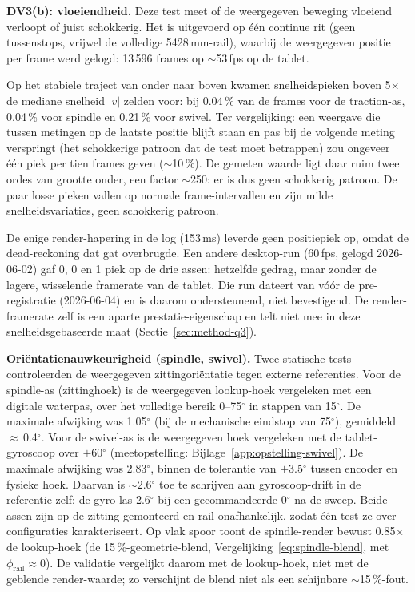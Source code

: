 \documentclass[10pt, a4paper, twocolumn]{article}
\begin{document}
\textbf{DV3(b): vloeiendheid.} Deze test meet of de weergegeven beweging vloeiend
verloopt of juist schokkerig. Het is uitgevoerd op één continue rit (geen
tussenstops, vrijwel de volledige 5428\,mm-rail), waarbij de weergegeven positie
per frame werd gelogd: 13\,596 frames op $\sim$53\,fps op de tablet.

Op het stabiele traject van onder naar boven kwamen snelheidspieken boven
5$\times$ de mediane snelheid $|v|$ zelden voor: bij 0.04\,\% van de frames voor
de traction-as, 0.04\,\% voor spindle en 0.21\,\% voor swivel. Ter vergelijking:
een weergave die tussen metingen op de laatste positie blijft staan en pas bij de
volgende meting verspringt (het schokkerige patroon dat de test
moet betrappen) zou ongeveer één piek per tien frames geven ($\sim$10\,\%). De
gemeten waarde ligt daar ruim twee ordes van grootte onder, een factor $\sim$250:
er is dus geen schokkerig patroon. De paar losse pieken vallen op normale
frame-intervallen en zijn milde snelheidsvariaties, geen schokkerig patroon.

De enige render-hapering in de log (153\,ms) leverde geen positiepiek op, omdat de
dead-reckoning dat gat overbrugde. Een andere desktop-run (60\,fps, gelogd
2026-06-02) gaf 0, 0 en 1 piek op de drie assen: hetzelfde gedrag, maar zonder de
lagere, wisselende framerate van de tablet. Die run dateert van vóór de
pre-registratie (2026-06-04) en is daarom ondersteunend, niet bevestigend. De
render-framerate zelf is een aparte prestatie-eigenschap en telt niet mee in deze
snelheidsgebaseerde maat (Sectie~\ref{sec:method-q3}).

\textbf{Oriëntatienauwkeurigheid (spindle, swivel).} Twee statische tests
controleerden de weergegeven zittingoriëntatie tegen externe referenties. Voor
de spindle-as (zittinghoek) is de weergegeven lookup-hoek vergeleken met een
digitale waterpas, over het volledige bereik 0--75$^\circ$ in stappen van
15$^\circ$. De maximale afwijking was 1.05$^\circ$ (bij de mechanische eindstop
van 75$^\circ$), gemiddeld $\approx$\,0.4$^\circ$. Voor de swivel-as is de
weergegeven hoek vergeleken met de tablet-gyroscoop over $\pm$60$^\circ$
(meetopstelling: Bijlage~\ref{app:opstelling-swivel}). De maximale afwijking was
2.83$^\circ$, binnen de tolerantie van $\pm$3.5$^\circ$ tussen encoder en fysieke hoek.
Daarvan is $\sim$2.6$^\circ$ toe te schrijven aan gyroscoop-drift in de
referentie zelf: de gyro las 2.6$^\circ$ bij een gecommandeerde 0$^\circ$ na de
sweep. Beide assen zijn op de zitting gemonteerd
en rail-onafhankelijk, zodat één test ze over configuraties karakteriseert. Op
vlak spoor toont de spindle-render bewust 0.85$\times$ de lookup-hoek (de
15\,\%-geometrie-blend, Vergelijking~\ref{eq:spindle-blend}, met
$\phi_{\text{rail}} \approx 0$). De validatie vergelijkt daarom met de
lookup-hoek, niet met de geblende render-waarde; zo verschijnt de blend niet als
een schijnbare $\sim$15\,\%-fout.
\end{document}
